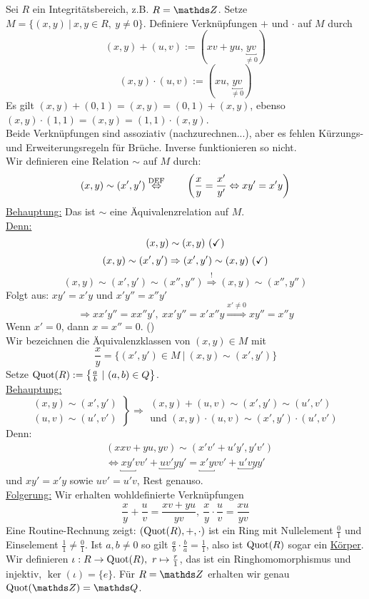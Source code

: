 Sei $R$ ein Integritätsbereich, z.B. $R=\Z$.
Setze $M=\{(x,y)~|~x,y\in R,~y\neq 0\}$.
Definiere Verknüpfungen $+$ und $\cdot$ auf $M$ durch
\[
(x,y)+(u,v):=(xv+yu,\underbracket{yv}_{\neq 0})
\]
\[
(x,y)\cdot (u,v):=(xu,\underbracket{yv}_{\neq 0})
\]
Es gilt $(x,y)+(0,1)=(x,y)=(0,1)+(x,y)$, ebenso $(x,y)\cdot (1,1)=(x,y)=(1,1)\cdot (x,y)$.\\
Beide Verknüpfungen sind assoziativ (nachzurechnen...), aber es fehlen Kürzungs- und Erweiterungsregeln für Brüche.
Inverse funktionieren so nicht.\\
Wir definieren eine Relation $\sim$ auf $M$ durch:
\[
(x,y)\sim(x',y')\stackrel{\text{DEF}}{\Leftrightarrow}\qquad \left( \frac{x}{y}=\frac{x'}{y'}\Leftrightarrow xy'=x'y\right)
\] 
\uline{Behauptung:} Das ist $\sim$ eine Äquivalenzrelation auf $M$.\\
\uline{Denn:} 
\[
(x,y)\sim(x,y)~ (\text{\checkmark})
\]
\[
(x,y)\sim(x',y')\Rightarrow(x',y')\sim(x,y)~ (\text{\checkmark})
\]
\[
(x,y)\sim(x',y')\sim(x'',y'')\stackrel{!}{\Rightarrow}(x,y)\sim(x'',y'')
\]
Folgt aus: $xy'=x'y$ und $x'y''=x''y'$
\[
\Rightarrow xx'y''=xx''y',~ xx'y''=x'x''y \stackrel{x'\neq 0}{\Rightarrow} xy''=x''y
\]
Wenn $x'=0$, dann $x=x''=0$. (\checkmark)\\

Wir bezeichnen die Äquivalenzklassen von $(x,y)\in M$ mit 
\[
\frac{x}{y}=\{(x',y')\in M~|~(x,y)\sim(x',y') \}
\]
Setze $\operatorname{Quot}(R):= \left\{\frac{a}{b}~|~(a,b)\in Q\right\}$.\\
\uline{Behauptung:}
\[
\left.\begin{array}{c} (x,y)\sim(x',y')\\ (u,v)\sim(u',v') \end{array}\right\} \Rightarrow \begin{array}{c} (x,y)+(u,v)\sim (x',y')\sim (u',v')\\\text{und } (x,y)\cdot(u,v)\sim(x',y')\cdot(u',v') \end{array}
\]
Denn:
\begin{equation*}
\begin{aligned}
	&(xxv+yu,yv)\sim(x'v'+u'y',y'v')\\
	&\Leftrightarrow \underbracket{xy'}vv'+\underbracket{uv'}yy'=\underbracket{x'y}vv'+\underbracket{u'v}yy'
\end{aligned}
\end{equation*}
und $xy'=x'y$ sowie $uv'=u'v$, Rest genauso.\\

\uline{Folgerung:} Wir erhalten wohldefinierte Verknüpfungen
\[
\frac{x}{y}+\frac{u}{v}=\frac{xv+yu}{yv},~\frac{x}{y}\cdot\frac{u}{v}=\frac{xu}{yv}
\]
Eine Routine-Rechnung zeigt: $(\operatorname{Quot}(R),+,\cdot)$ ist ein Ring mit Nullelement $\frac{0}{1}$ und Einselement $\frac{1}{1}\neq \frac{0}{1}$.
Ist $a,b\neq 0$ so gilt $\frac{a}{b}\cdot\frac{b}{a}=\frac{1}{1}$, also ist $\operatorname{Quot}(R)$ sogar ein \uline{Körper}.\\
Wir definieren $\iota:R\to\operatorname{Quot}(R),~ r\mapsto \frac{r}{1}$, das ist ein Ringhomomorphismus und injektiv, $\ker(\iota)=\{e\}$.
Für $R=\Z$ erhalten wir genau $\Quot(\Z)=\Q$.

